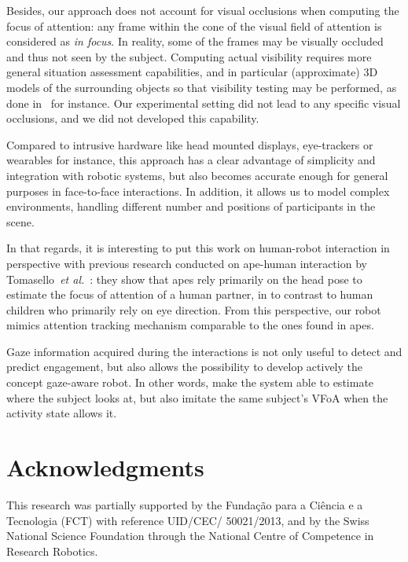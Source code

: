 \documentclass{sig-alternate}
\newcommand{\etal}{\textit{et al.}\xspace}
\begin{document}
Besides, our approach does not account for visual occlusions when computing the
focus of attention: any frame within the cone of the visual field of attention
is considered as \emph{in focus}. In reality, some of the frames may be visually
occluded and thus not seen by the subject. Computing actual visibility requires
more general situation assessment capabilities, and in particular (approximate)
3D models of the surrounding objects so that visibility testing may be
performed, as done in~\cite{sisbot2011situation} for instance. Our experimental
setting did not lead to any specific visual occlusions, and we did not developed
this capability.

Compared to intrusive hardware like head mounted
displays, eye-trackers or wearables for instance, this approach has a clear
advantage of simplicity and integration with robotic systems, but also becomes
accurate enough for general purposes in face-to-face interactions. In addition,
it allows us to model complex environments, handling different number and
positions of participants in the scene.

In that regards, it is interesting to put this work on human-robot interaction
in perspective with previous research conducted on ape-human interaction by
Tomasello~\etal~\cite{tomasello2007reliance}: they show that apes rely primarily
on the head pose to estimate the focus of attention of a human partner, in to contrast
to human children who primarily rely on eye direction. From this perspective,
our robot mimics attention tracking mechanism comparable to the ones found in apes.

Gaze information acquired during the interactions is not only useful to detect
and predict engagement, but also allows the possibility to develop actively the
concept gaze-aware robot. In other words, make the system able to estimate where
the subject looks at, but also imitate the same subject's VFoA when the activity
state allows it. 

\section*{Acknowledgments}

This research was partially supported by the Funda\c{c}\~{a}o para a Ci\^{e}ncia
e a Tecnologia (FCT) with reference UID/CEC/ 50021/2013, and by the Swiss
National Science Foundation through the National Centre of Competence in
Research Robotics.



\end{document}
